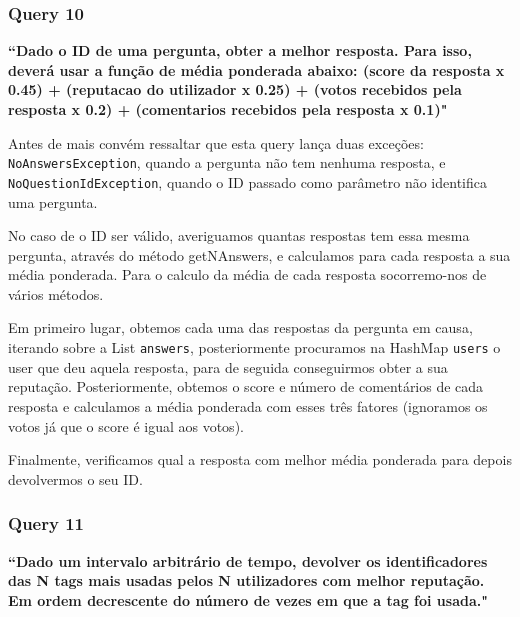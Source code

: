 \documentclass[a4paper]{article}
\begin{document}
\vspace{0.1cm}


\subsubsection*{Query 10}
\label{sec:query10}

\textbf{“Dado o ID de uma pergunta, obter a melhor resposta.
Para isso, deverá usar a função de média ponderada abaixo: (score da resposta x 0.45)
+ (reputacao do utilizador x 0.25) + (votos recebidos pela resposta x 0.2) +
(comentarios recebidos pela resposta x 0.1)"}\par

\vspace{0.1cm}

Antes de mais convém ressaltar que esta query lança duas exceções:
\texttt{NoAnswersException}, quando a pergunta não tem nenhuma resposta, e
\texttt{NoQuestionIdException}, quando o ID passado como parâmetro não identifica
uma pergunta.\par
No caso de o ID ser válido, averiguamos quantas respostas tem essa mesma pergunta,
através do método getNAnswers, e calculamos para cada resposta a sua média ponderada.
Para o calculo da média de cada resposta socorremo-nos de vários métodos.\par
Em primeiro lugar, obtemos cada uma das respostas da pergunta em causa, iterando
sobre a List \texttt{answers}, posteriormente procuramos na HashMap \texttt{users}
o user que deu aquela resposta, para de seguida conseguirmos obter a sua reputação.
Posteriormente, obtemos o score e número de comentários de cada resposta e calculamos
a média ponderada com esses três fatores (ignoramos os votos já que o score é
igual aos votos).\par
Finalmente, verificamos qual a resposta com melhor média ponderada para depois
devolvermos o seu ID.





\subsubsection*{Query 11}
\label{sec:query11}

\textbf{“Dado um intervalo arbitrário de tempo, devolver os identificadores das N tags
mais usadas pelos N utilizadores com melhor reputação. Em ordem decrescente do número
de vezes em que a tag foi usada."}

\vspace{0.1cm}
\end{document}
